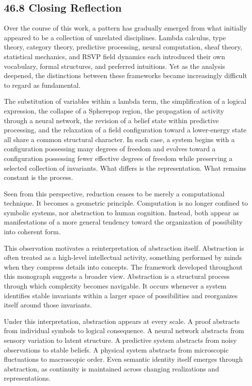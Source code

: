 \documentclass[12pt,letterpaper]{article}
\theoremstyle{remark}
\begin{document}
\subsection{46.8 Closing Reflection}

Over the course of this work, a pattern has gradually emerged from what initially appeared to be a collection of unrelated disciplines. Lambda calculus, type theory, category theory, predictive processing, neural computation, sheaf theory, statistical mechanics, and RSVP field dynamics each introduced their own vocabulary, formal structures, and preferred intuitions. Yet as the analysis deepened, the distinctions between these frameworks became increasingly difficult to regard as fundamental.

The substitution of variables within a lambda term, the simplification of a logical expression, the collapse of a Spherepop region, the propagation of activity through a neural network, the revision of a belief state within predictive processing, and the relaxation of a field configuration toward a lower-energy state all share a common structural character. In each case, a system begins with a configuration possessing many degrees of freedom and evolves toward a configuration possessing fewer effective degrees of freedom while preserving a selected collection of invariants. What differs is the representation. What remains constant is the process.

Seen from this perspective, reduction ceases to be merely a computational technique. It becomes a geometric principle. Computation is no longer confined to symbolic systems, nor abstraction to human cognition. Instead, both appear as manifestations of a more general tendency toward the organization of possibility into coherent form.

This observation motivates a reinterpretation of abstraction itself. Abstraction is often treated as a high-level intellectual activity, something performed by minds when they compress details into concepts. The framework developed throughout this monograph suggests a broader view. Abstraction is a structural process through which complexity becomes navigable. It occurs whenever a system identifies stable invariants within a larger space of possibilities and reorganizes itself around those invariants.

Under this interpretation, abstraction appears at every scale. A proof abstracts from individual symbols to logical consequence. A neural network abstracts from sensory variation to latent structure. A predictive system abstracts from noisy observations to stable beliefs. A physical system abstracts from microscopic fluctuations to macroscopic order. Even semantic identity itself emerges through abstraction, as continuity is maintained across changing realizations and representations.
\end{document}
